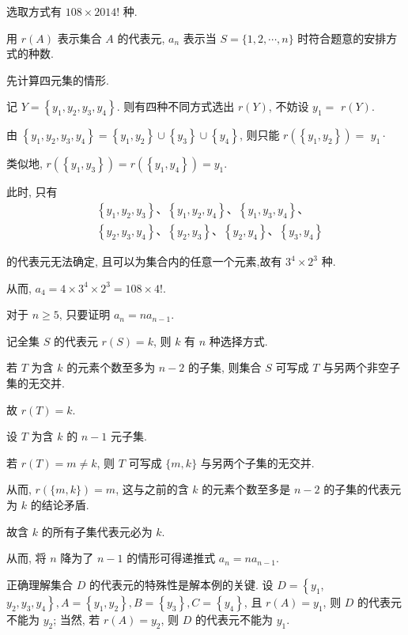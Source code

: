 \begin{solution}
	选取方式有 $108 \times 2014!$ 种.

	用 $r(A)$ 表示集合 $A$ 的代表元, $a_{n}$ 表示当 $S=\{1,2, \cdots, n\}$ 时符合题意的安排方式的种数.

	先计算四元集的情形.

	记 $Y=\left\{y_{1}, y_{2}, y_{3}, y_{4}\right\}$. 则有四种不同方式选出 $r(Y)$, 不妨设 $y_{1}=$ $r(Y)$.

	由 $\left\{y_{1}, y_{2}, y_{3}, y_{4}\right\}=\left\{y_{1}, y_{2}\right\} \cup\left\{y_{3}\right\} \cup\left\{y_{4}\right\}$, 则只能 $r\left(\left\{y_{1}, y_{2}\right\}\right)=$ $y_{1} \cdot$

	类似地, $r\left(\left\{y_{1}, y_{3}\right\}\right)=r\left(\left\{y_{1}, y_{4}\right\}\right)=y_{1}$.

	此时, 只有
	$$
		\begin{aligned}
			 & \left\{y_{1}, y_{2}, y_{3}\right\} 、\left\{y_{1}, y_{2}, y_{4}\right\} 、\left\{y_{1}, y_{3}, y_{4}\right\} 、              \\
			 & \left\{y_{2}, y_{3}, y_{4}\right\} 、\left\{y_{2}, y_{3}\right\} 、\left\{y_{2}, y_{4}\right\} 、\left\{y_{3}, y_{4}\right\}
		\end{aligned}
	$$

	的代表元无法确定, 且可以为集合内的任意一个元素,故有 $3^{4} \times 2^{3}$ 种.

	从而, $a_{4}=4 \times 3^{4} \times 2^{3}=108 \times 4!$.

	对于 $n \geqslant 5$, 只要证明 $a_{n}=n a_{n-1}$.

	记全集 $S$ 的代表元 $r(S)=k$, 则 $k$ 有 $n$ 种选择方式.

	若 $T$ 为含 $k$ 的元素个数至多为 $n-2$ 的子集, 则集合 $S$ 可写成 $T$ 与另两个非空子集的无交并.

	故 $r(T)=k$.

	设 $T$ 为含 $k$ 的 $n-1$ 元子集.

	若 $r(T)=m \neq k$, 则 $T$ 可写成 $\{m, k\}$ 与另两个子集的无交并.

	从而, $r(\{m, k\})=m$, 这与之前的含 $k$ 的元素个数至多是 $n-2$ 的子集的代表元为 $k$ 的结论矛盾.

	故含 $k$ 的所有子集代表元必为 $k$.

	从而, 将 $n$ 降为了 $n-1$ 的情形可得递推式 $a_{n}=n a_{n-1}$.
\end{solution}

\begin{note}
	正确理解集合 $D$ 的代表元的特殊性是解本例的关键. 设 $D=\left\{y_{1}\right.$, $\left.y_{2}, y_{3}, y_{4}\right\}, A=\left\{y_{1}, y_{2}\right\}, B=\left\{y_{3}\right\}, C=\left\{y_{4}\right\}$, 且 $r(A)=y_{1}$, 则 $D$ 的代表元不能为 $y_{2}$; 当然, 若 $r(A)=y_{2}$, 则 $D$ 的代表元不能为 $y_{1}$.
\end{note}

